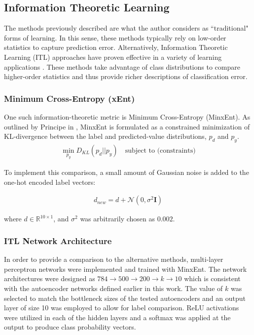 \documentclass[conference]{IEEEtran}
\begin{document}
	 
	 
	 \subsection{Information Theoretic Learning}
	 The methods previously described are what the author considers as ``traditional" forms of learning.  In this sense, these methods typically rely on low-order statistics to capture prediction error.  Alternatively, Information Theoretic Learning (ITL) approaches have proven effective in a variety of learning applications \cite{Principe2010ITL}.  These methods take advantage of class distributions to compare higher-order statistics and thus provide richer  descriptions of classification error.
	 
	 \subsubsection*{Minimum Cross-Entropy (xEnt)}
	 One such information-theoretic metric is Minimum Cross-Entropy (MinxEnt).  As outlined by Principe in \cite{Principe2010ITL}, MinxEnt is formulated as a constrained minimization of KL-divergence between the label and predicted-value distributions, $p_d$ and $p_y$. 
	 \begin{align}
	 	\min_{p_y}D_{KL}(p_d||p_y) \quad \text{subject to (constraints)}
	 \end{align} 
	 
	 \noindent To implement this comparison, a small amount of Gaussian noise is added to the one-hot encoded label vectors:
	 
	 \begin{align}
	 	d_{new} = d + \mathcal{N}(0,\sigma^2\mathbf{I})
	 \end{align}
	 
	 \noindent where $d\in\mathbb{R}^{10\times1}$, and $\sigma^2$ was arbitrarily chosen as $0.002$.
	 
	 \subsubsection*{ITL Network Architecture}
	 In order to provide a comparison to the alternative methods, multi-layer perceptron networks were implemented and trained with MinxEnt.  The network architectures were designed as $784 \rightarrow 500 \rightarrow 200 \rightarrow k \rightarrow 10$ which is consistent with the autoencoder networks defined earlier in this work.  The value of $k$ was selected to match the bottleneck sizes of the tested autoencoders and an output layer of size 10 was employed to allow for label comparison.  ReLU activations were utilized in each of the hidden layers and a softmax was applied at the output to produce class probability vectors.
	 
\end{document}

